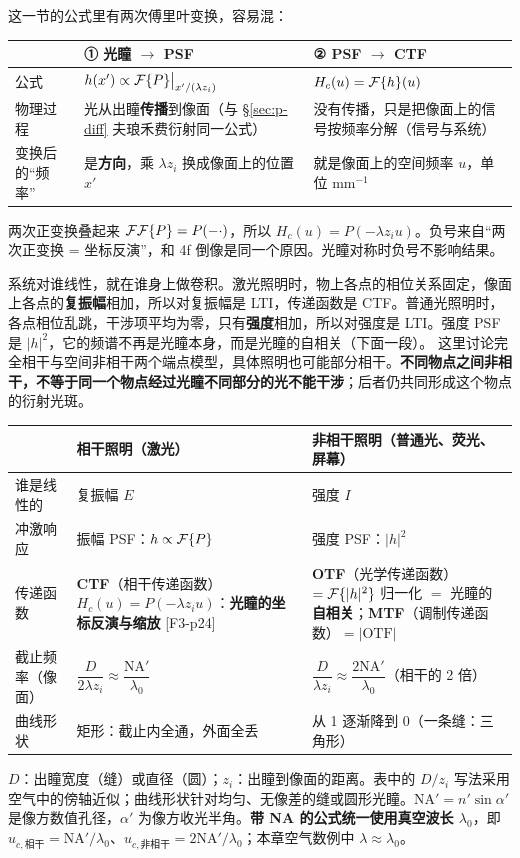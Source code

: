 这一节的公式里有两次傅里叶变换，容易混：
\begin{center}\small\renewcommand{\arraystretch}{1.4}
\begin{tabular}{@{}P{2.6cm}P{5.6cm}P{6.6cm}@{}}
\toprule
 & ① 光瞳 $\to$ PSF & ② PSF $\to$ CTF\\ \midrule
公式 & $h(x')\propto\mathcal{F}\{P\}\big|_{x'/(\lambda z_i)}$ & $H_c(u)=\mathcal{F}\{h\}(u)$\\
物理过程 & 光从出瞳\textbf{传播}到像面（与 §\ref{sec:p-diff} 夫琅禾费衍射同一公式） & 没有传播，只是把像面上的信号按频率分解（信号与系统）\\
变换后的“频率” & 是\textbf{方向}，乘 $\lambda z_i$ 换成像面上的位置 $x'$ & 就是像面上的空间频率 $u$，单位 mm$^{-1}$\\
\bottomrule
\end{tabular}
\end{center}
两次正变换叠起来 $\mathcal{F}\mathcal{F}\{P\}=P(-\cdot)$，所以 $H_c(u)=P(-\lambda z_iu)$。负号来自“两次正变换 = 坐标反演”，和 4f 倒像是同一个原因。光瞳对称时负号不影响结果。

系统对谁线性，就在谁身上做卷积。激光照明时，物上各点的相位关系固定，像面上各点的\textbf{复振幅}相加，所以对复振幅是 LTI，传递函数是 CTF。普通光照明时，各点相位乱跳，干涉项平均为零，只有\textbf{强度}相加，所以对强度是 LTI。强度 PSF 是 $|h|^2$，它的频谱不再是光瞳本身，而是光瞳的自相关（下面一段）。
这里讨论完全相干与空间非相干两个端点模型，具体照明也可能部分相干。\textbf{不同物点之间非相干，不等于同一个物点经过光瞳不同部分的光不能干涉}；后者仍共同形成这个物点的衍射光斑。


\begin{center}\small\renewcommand{\arraystretch}{1.45}
\begin{tabular}{@{}P{2.4cm}P{6.3cm}P{6.6cm}@{}}
\toprule
 & 相干照明（激光） & 非相干照明（普通光、荧光、屏幕）\\ \midrule
谁是线性的 & 复振幅 $E$ & 强度 $I$\\
冲激响应 & 振幅 PSF：$h\propto\mathcal{F}\{P\}$ & 强度 PSF：$|h|^2$\\
传递函数 & \textbf{CTF}（相干传递函数）$H_c(u)=P(-\lambda z_iu)$：\textbf{光瞳的坐标反演与缩放} [F3-p24] & \textbf{OTF}（光学传递函数）$=\mathcal{F}\{|h|^2\}$ 归一化 $=$ 光瞳的\textbf{自相关}；\textbf{MTF}（调制传递函数）$=|\text{OTF}|$\\
截止频率（像面） & $\dfrac{D}{2\lambda z_i}\approx\dfrac{\mathrm{NA}'}{\lambda_0}$ & $\dfrac{D}{\lambda z_i}\approx\dfrac{2\mathrm{NA}'}{\lambda_0}$（相干的 2 倍）\\
曲线形状 & 矩形：截止内全通，外面全丢 & 从 1 逐渐降到 0（一条缝：三角形）\\
\bottomrule
\end{tabular}
\end{center}
$D$：出瞳宽度（缝）或直径（圆）；$z_i$：出瞳到像面的距离。表中的 $D/z_i$ 写法采用空气中的傍轴近似；曲线形状针对均匀、无像差的缝或圆形光瞳。$\mathrm{NA}'=n'\sin\alpha'$ 是像方数值孔径，$\alpha'$ 为像方收光半角。\textbf{带 NA 的公式统一使用真空波长 $\lambda_0$}，即 $u_{c,\text{相干}}=\mathrm{NA}'/\lambda_0$、$u_{c,\text{非相干}}=2\mathrm{NA}'/\lambda_0$；本章空气数例中 $\lambda\approx\lambda_0$。

